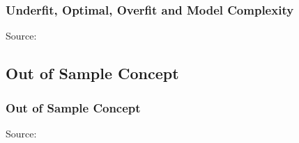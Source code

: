 \documentclass{beamer}
\begin{document}
\begin{frame}
  \frametitle{Underfit, Optimal, Overfit and Model Complexity}
  \hspace*{15pt}\hbox{\scriptsize Source:}
\end{frame}



\subsection{Out of Sample Concept}

\begin{frame}
  \frametitle{Out of Sample Concept}
  \hspace*{15pt}\hbox{\scriptsize Source:}
\end{frame}
\end{document}
